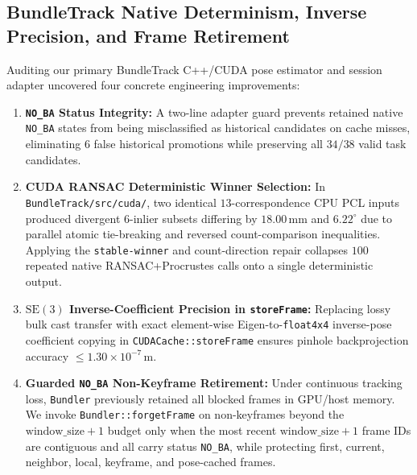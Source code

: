 \documentclass[10pt,journal]{IEEEtran}
\begin{document}
\subsection{BundleTrack Native Determinism, Inverse Precision, and Frame Retirement}
\label{sec:native_bt}
Auditing our primary BundleTrack C++/CUDA pose estimator and session adapter uncovered four concrete engineering improvements:
\begin{enumerate}
    \item \textbf{\texttt{NO\_BA} Status Integrity:} A two-line adapter guard prevents retained native \texttt{NO\_BA} states from being misclassified as historical candidates on cache misses, eliminating $6$ false historical promotions while preserving all $34/38$ valid task candidates.
    \item \textbf{CUDA RANSAC Deterministic Winner Selection:} In \texttt{BundleTrack/src/cuda/}, two identical $13$-correspondence CPU PCL inputs produced divergent $6$-inlier subsets differing by $18.00\,\mathrm{mm}$ and $6.22^\circ$ due to parallel atomic tie-breaking and reversed count-comparison inequalities. Applying the \texttt{stable-winner} and count-direction repair collapses $100$ repeated native RANSAC+Procrustes calls onto a single deterministic output.
    \item \textbf{$\mathrm{SE}(3)$ Inverse-Coefficient Precision in \texttt{storeFrame}:} Replacing lossy bulk cast transfer with exact element-wise Eigen-to-\texttt{float4x4} inverse-pose coefficient copying in \texttt{CUDACache::storeFrame} ensures pinhole backprojection accuracy $\le 1.30\times 10^{-7}\,\mathrm{m}$.
    \item \textbf{Guarded \texttt{NO\_BA} Non-Keyframe Retirement:} Under continuous tracking loss, \texttt{Bundler} previously retained all blocked frames in GPU/host memory. We invoke \texttt{Bundler::forgetFrame} on non-keyframes beyond the $\text{window\_size}+1$ budget only when the most recent $\text{window\_size}+1$ frame IDs are contiguous and all carry status \texttt{NO\_BA}, while protecting first, current, neighbor, local, keyframe, and pose-cached frames.
\end{enumerate}
\end{document}
